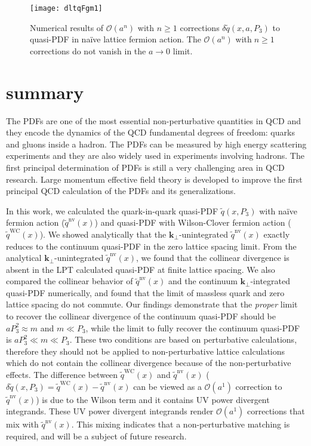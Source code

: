 \documentclass[english,preprint,aps,prd,showpacs,superscriptaddress,nofootinbib,tightenlines]{revtex4}
\begin{document}
\begin{figure}
  \begin{centering}
  \texttt{[image: dltqFgm1]}\caption{Numerical results of $\mathcal{O}\left(a^n\right)$ with $n\geq 1$ corrections $\delta\tilde{q}(x,a,P_3)$ to quasi-PDF in na\"ive lattice fermion action. The $\mathcal{O}\left(a^{n}\right)$ with$\;n\geq 1 $
  corrections do not vanish in the  $a\rightarrow0$ limit.}
  \label{fg:fabc_Oa1}
  \par\end{centering}
  \end{figure}

\section{summary}

The PDFs  are one of the most essential non-perturbative quantities in QCD
and they  encode the dynamics of the QCD fundamental degrees of freedom: quarks
and gluons inside a hadron. The PDFs can be measured by high energy scattering
experiments and they are also widely used in  experiments involving
hadrons. The first principal determination of PDFs is still a very
challenging area in QCD research. Large momentum effective field
theory is developed to improve the first principal QCD calculation
of the PDFs and its generalizations.

In this work, we calculated the quark-in-quark quasi-PDF $\tilde{q}\left(x,P_3\right)$ with na\"ive fermion action ($\tilde{q}^{\mathrm{nv}}(x)$) and quasi-PDF with Wilson-Clover fermion action ($\tilde{q}^{\mathrm{WC}}(x)$).
We showed  analytically that the
$\boldsymbol{k}_{\perp}$-unintegrated $\tilde{q}^{\mathrm{nv}}(x)$ exactly reduces to the continuum quasi-PDF in the zero lattice
spacing limit. From the analytical $\boldsymbol{k}_{\perp}$-unintegrated $\tilde{q}^{\mathrm{nv}}(x)$, we found that the collinear divergence
is absent in the LPT calculated quasi-PDF at finite lattice spacing.
We also compared the collinear behavior of $\tilde{q}^{\mathrm{nv}}(x)$
and the continuum $\boldsymbol{k}_{\perp}$-integrated quasi-PDF numerically, and
found that the limit of massless quark and zero lattice spacing
do not commute. Our findings demonstrate that the \emph{proper} limit to recover the collinear
divergence of the continuum quasi-PDF should be $aP_{3}^{2}\approx m$ and $m \ll P_{3}$, while the limit to fully recover
the continuum quasi-PDF is $aP_{3}^{2}\ll m\ll P_{3}$. These two conditions are based on perturbative calculations, therefore they should not be applied to non-perturbative lattice calculations which do not contain the collinear divergence because of the non-perturbative effects. The difference between $\tilde{q}^{\mathrm{WC}}(x)$ and $\tilde{q}^{\mathrm{nv}}(x)$ ($\delta\tilde q\left(x,P_3\right)=\tilde{q}^{\mathrm{WC}}(x)-\tilde{q}^{\mathrm{nv}}(x)$ can be viewed as a $\mathcal{O}\left(a^{1}\right)$ correction to $\tilde{q}^{\mathrm{nv}}(x)$) is due to the Wilson term and it contains UV power divergent integrands. These UV power divergent integrands render $\mathcal{O}\left(a^1\right)$ corrections that mix with $\tilde{q}^\mathrm{nv}(x)$.
This mixing indicates that a non-perturbative matching is required, and will be a subject of future research.
\end{document}
